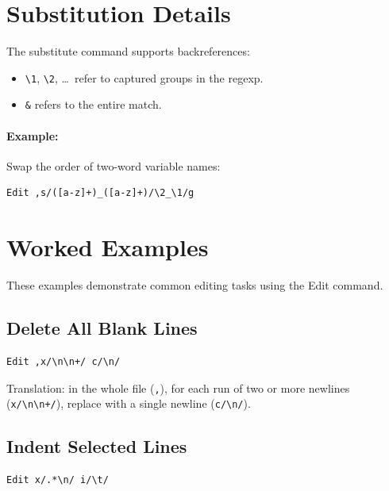 \section{Substitution Details}
\label{sec:subst}


The substitute command supports backreferences:

\begin{itemize}
\item \texttt{\textbackslash 1}, \texttt{\textbackslash 2}, \ldots\
      refer to captured groups in the regexp.
\item \texttt{\&} refers to the entire match.
\end{itemize}

\paragraph{Example:} Swap the order of two-word variable names:

\begin{Verbatim}[frame=single]
Edit ,s/([a-z]+)_([a-z]+)/\2_\1/g
\end{Verbatim}

\section{Worked Examples}
\label{sec:examples}

These examples demonstrate common editing tasks using the Edit command.

\subsection{Delete All Blank Lines}

\begin{Verbatim}[frame=single]
Edit ,x/\n\n+/ c/\n/
\end{Verbatim}

\noindent
Translation: in the whole file (\texttt{,}), for each run of two or
more newlines (\texttt{x/\textbackslash n\textbackslash n+/}), replace
with a single newline (\texttt{c/\textbackslash n/}).

\subsection{Indent Selected Lines}

\begin{Verbatim}[frame=single]
Edit x/.*\n/ i/\t/
\end{Verbatim}

